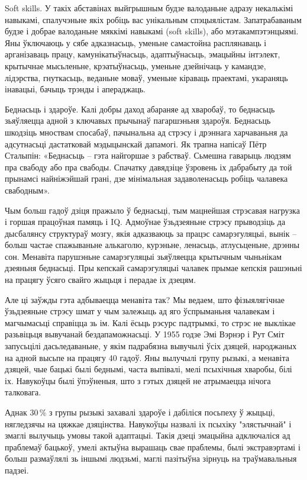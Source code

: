 Soft skills. У такіх абставінах выйгрышным будзе валоданьне адразу некалькімі навыкамі, спалучэньне якіх робіць вас унікальным спэцыялістам. Запатрабаваным будзе і добрае валоданьне мяккімі навыкамі (soft skills), або мэтакампэтэнцыямі. Яны ўключаюць у сябе адказнасьць, уменьне самастойна расплянаваць і арганізаваць працу, камунікатыўнасьць, адаптыўнасьць, эмацыйны інтэлект, крытычнае мысьленьне, крэатыўнасьць, уменьне дзейнічаць у камандзе, лідэрства, гнуткасьць, веданьне моваў, уменьне кіраваць праектамі, укараняць інавацыі, бачыць трэнды і апераджаць.

Беднасьць і здароўе. Калі добры даход абараняе ад хваробаў, то беднасьць зьяўляецца адной з ключавых прычынаў пагаршэньня здароўя. Беднасьць шкодзіць мноствам спосабаў, пачынальна ад стрэсу і дрэннага харчаваньня да адсутнасьці дастатковай мэдыцынскай дапамогі. Як трапна напісаў Пётр Сталыпін: «Беднасьць – гэта найгоршае з рабстваў. Сьмешна гаварыць людзям пра свабоду або пра свабоды. Спачатку давядзіце ўзровень іх дабрабыту да той прынамсі найніжэйшай грані, дзе мінімальная задаволенасьць робіць чалавека свабодным».

Чым больш гадоў дзіця пражыло ў беднасьці, тым мацнейшая стрэсавая нагрузка і горшая працоўная памяць і IQ. Адмоўнае ўзьдзеяньне стрэсу прыводзіць да дысбалянсу структураў мозгу, якія адказваюць за працэс самарэгуляцыі, вынік – больш частае спажываньне алькаголю, курэньне, ленасьць, атлусьценьне, дрэнны сон. Менавіта парушэньне самарэгуляцыі зьяўляецца крытычным чыньнікам дзеяньня беднасьці. Пры кепскай самарэгуляцыі чалавек прымае кепскія рашэньні на працягу ўсяго свайго жыцьця і перадае іх дзецям.

Але ці заўжды гэта адбываецца менавіта так? Мы ведаем, што фізыялягічнае ўзьдзеяньне стрэсу шмат у чым залежыць ад яго ўспрыманьня чалавекам і магчымасьці справіцца зь ім. Калі ёсьць рэсурс падтрымкі, то стрэс не выклікае разьвіцьця вывучанай бездапаможнасьці. У 1955 годзе Эмі Вэрнэр і Рут Сміт запусьцілі дасьледаваньне, у якім падрабязна вывучылі ўсіх дзяцей, народжаных на адной высьпе на працягу 40 гадоў. Яны вылучылі групу рызыкі, а менавіта дзяцей, чые бацькі былі беднымі, часта выпівалі, мелі псыхічныя хваробы, білі іх. Навукоўцы былі ўпэўненыя, што з гэтых дзяцей не атрымаецца нічога талковага.

Аднак 30\,\% з групы рызыкі захавалі здароўе і дабіліся посьпеху ў жыцьці, нягледзячы на цяжкае дзяцінства. Навукоўцы назвалі іх псыхіку "элястычнай" і змаглі вылучыць умовы такой адаптацыі. Такія дзеці эмацыйна адключаліся ад праблемаў бацькоў, умелі актыўна вырашаць свае праблемы, былі экстравэртамі і больш размаўлялі зь іншымі людзьмі, маглі пазітыўна зірнуць на траўмавальныя падзеі.

